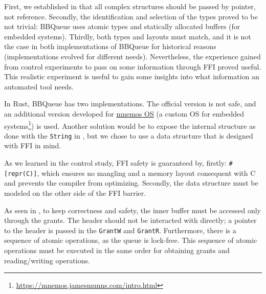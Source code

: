 \documentclass[nomenclature, english, bibtex]{kththesis}
\begin{document}
{First, we established in 
that all complex structures should be passed by pointer, not reference.
Secondly, the identification and selection of the types proved to be not trivial: BBQueue uses atomic types and statically allocated buffers (for embedded systems).
Thirdly, both types and layouts must match, and it is not the case in both implementations of BBQueue for historical reasons (implementations evolved for different needs).
Nevertheless, the experience gained from control experiments to pass on some information through \gls{FFI} proved useful. This realistic experiment is useful to gain some insights into what information an automated tool needs.

In Rust, BBQueue has two implementations. The official version is not  safe, and an additional version developed for \href{https://github.com/tosc-rs/mnemos/tree/main/source/abi/src/bbqueue_ipc}{mnemos OS} (a custom OS for embedded systems\footnote{\url{https://mnemos.jamesmunns.com/intro.html}}) is used. Another solution would be to expose the internal structure as done with the \texttt{String} in , but we chose to use a data structure that is designed with FFI in mind. 

As we learned in the control study,  FFI safety is guaranteed by, firstly: \texttt{\#[repr(C)]}, which ensures no mangling and a memory layout consequent with C and prevents the compiler from optimizing. Secondly, the data structure must be modeled on the other side of the FFI barrier.

As seen in , to keep correctness and safety, the inner buffer must be accessed only through the grants. The header should not be interacted with directly; a pointer to the header is passed in the  \texttt{GrantW} and \texttt{GrantR}. Furthermore, there is a sequence of atomic operations, as the queue is lock-free. This sequence of atomic operations must be executed in the same order for obtaining grants and reading/writing operations.
   

}
\end{document}
